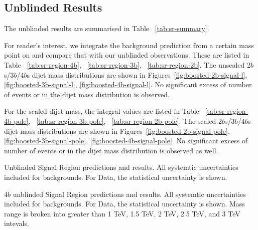 \subsection{Unblinded Results}
The unblinded results are summarised in Table ~\ref{tab:sr-summary}. 

For reader's interest, we integrate the background prediction from a certain mass point on and compare that with our unblinded observations. These are listed in Table ~\ref{tab:sr-region-4b}, ~\ref{tab:sr-region-3b}, ~\ref{tab:sr-region-2b}. The unscaled 2$b$s/3$b$/4$b$s dijet mass distributions are shown in Figures~\ref{fig:boosted-2b-signal-l}, \ref{fig:boosted-3b-signal-l}, \ref{fig:boosted-4b-signal-l}. No significant excess of number of events or in the dijet mass distribution is observed.

For the scaled dijet mass, the integral values are listed in Table ~\ref{tab:sr-region-4b-pole}, ~\ref{tab:sr-region-3b-pole}, ~\ref{tab:sr-region-2b-pole}. The scaled 2$b$s/3$b$/4$b$s dijet mass distributions are shown in Figures~\ref{fig:boosted-2b-signal-pole}, \ref{fig:boosted-3b-signal-pole}, \ref{fig:boosted-4b-signal-pole}. No significant excess of number of events or in the dijet mass distribution is observed as well.


\begin{table}[htbp!]
\scriptsize
\begin{center}

\caption{Unblinded Signal Region predictions and results. All systemtic uncertainties included for backgrounds. For Data, the statistical uncertainty is shown.}
\label{tab:sr-summary}
\end{center}
\end{table}

\begin{table}[htbp!]
\scriptsize
\begin{center}

\caption{4$b$ unblinded Signal Region predictions and results. All systemtic uncertainties included for backgrounds. For Data, the statistical uncertainty is shown. Mass range is broken into greater than 1 TeV, 1.5 TeV, 2 TeV, 2.5 TeV, and 3 TeV intevals.}
\label{tab:sr-region-4b}
\end{center}
\end{table}

